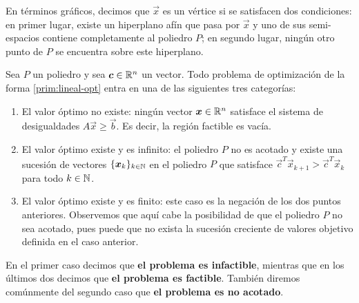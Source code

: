 En términos gráficos, decimos que $\vec{x}$ es un vértice si se satisfacen dos condiciones: en
primer lugar, existe un hiperplano afín que pasa por $\vec{x}$ y uno de sus semi-espacios
contiene completamente al poliedro $P$; en segundo lugar, ningún otro punto de $P$ se encuentra
sobre este hiperplano.

\begin{definition}
Sea $P$ un poliedro y sea $\boldsymbol{c} \in \mathbb{R}^n$ un vector. Todo problema de optimización de la forma
\eqref{prim:lineal-opt} entra en una de las siguientes tres categorías:
\begin{enumerate}
	\item El valor óptimo no existe: ningún vector $\boldsymbol{x} \in \mathbb{R}^n$ satisface
		el sistema de desigualdades $A\vec{x} \geq \vec{b}$. Es decir, la región factible es vacía.
	\item El valor óptimo existe y es infinito: el poliedro $P$ no es acotado y
		existe una sucesión de vectores $\lbrace \boldsymbol{x}_k \rbrace_{k \in \mathbb{N}}$
		en el poliedro $P$ que satisface $\vec{c}^T\vec{x}_{k+1} > \vec{c}^T\vec{x}_k$ para todo $k \in \mathbb{N}$.
	\item El valor óptimo existe y es finito: este caso es la negación de los dos puntos anteriores.
		Observemos que aquí cabe la posibilidad de que el poliedro $P$ no sea acotado, pues puede
		que no exista la sucesión creciente de valores objetivo definida en el caso anterior.
\end{enumerate}
En el primer caso decimos que \textbf{el problema es infactible}, mientras que en los últimos dos
decimos que \textbf{el problema es factible}. También diremos comúnmente del segundo caso que
\textbf{el problema es no acotado}.
\end{definition}

